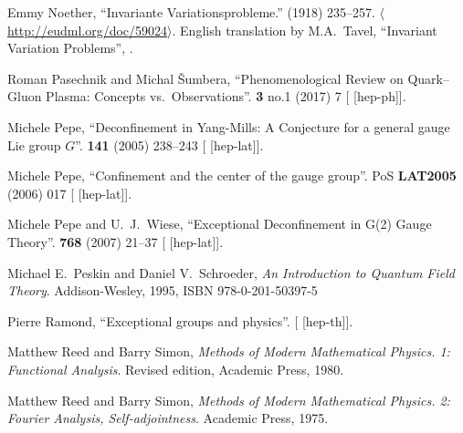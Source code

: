 \begin{thebibliography}{99}
Emmy Noether,
``Invariante Variationsprobleme.''
 (1918) 235--257.
$\langle$\url{http://eudml.org/doc/59024}$\rangle$. 
English translation by M.A.~Tavel, ``Invariant Variation Problems'',
.

Roman Pasechnik and Michal \v{S}umbera,
``Phenomenological Review on Quark--Gluon Plasma: Concepts vs.\ Observations''.
 \textbf{3} no.1 (2017) 7
{\tt{}}
[ [hep-ph]].

Michele Pepe,
``Deconfinement in Yang-Mills: A Conjecture for a general gauge Lie group $G$''.
 \textbf{141} (2005) 238--243
{\tt{}}
[ [hep-lat]].

Michele Pepe,
``Confinement and the center of the gauge group''.
PoS \textbf{LAT2005} (2006) 017
{\tt{}}
[ [hep-lat]].

Michele Pepe and U.~J.~Wiese,
``Exceptional Deconfinement in G(2) Gauge Theory''.
 \textbf{768} (2007) 21--37
{\tt{}}
[ [hep-lat]].

Michael E.~Peskin and Daniel V.~Schroeder,
\textit{An Introduction to Quantum Field Theory}.
Addison-Wesley, 1995,
ISBN 978-0-201-50397-5

Pierre Ramond,
``Exceptional groups and physics''.
[ [hep-th]].

Matthew Reed and Barry Simon,
\textit{Methods of Modern Mathematical Physics. 1: Functional Analysis}.
Revised edition, Academic Press, 1980.

Matthew Reed and Barry Simon,
\textit{Methods of Modern Mathematical Physics. 2: Fourier Analysis, Self-adjointness}.
Academic Press, 1975.



\end{thebibliography}
